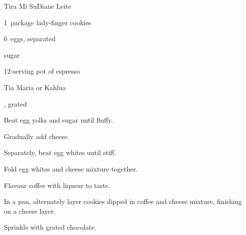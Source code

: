\begin{recipe}{Tira Mi Su}{Diane Leite}{}

\begin{ingredients}
\item 1~package lady-finger cookies
\item {} 
\item 6~eggs, separated
\item \C{\threequarter} sugar
\item 12-serving pot of espresso
\item Tia Maria or Kahlua
\item {}, grated
\end{ingredients}

\begin{directions}
\item Beat egg yolks and sugar until fluffy.
\item Gradually add cheese.
\item Separately, beat egg whites until stiff.
\item Fold egg whites and cheese mixture together.
\item Flavour coffee with liqueur to taste.
\item In a pan, alternately layer cookies dipped in coffee and cheese mixture, finishing on a cheese layer.
\item Sprinkle with grated chocolate.
\end{directions}

\end{recipe}
